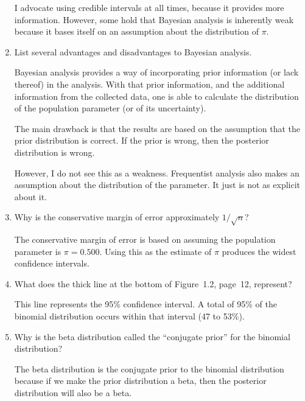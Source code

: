 \begin{enumerate}
\begin{solution}
I advocate using credible intervals at all times, because it provides more information. However, some hold that Bayesian analysis is inherently weak because it bases itself on an assumption about the distribution of $\pi$.
\end{solution}
%


  \item List several advantages and disadvantages to Bayesian analysis.
\begin{solution}
Bayesian analysis provides a way of incorporating prior information (or lack thereof) in the analysis. With that prior information, and the additional information from the collected data, one is able to calculate the distribution of the population parameter (or of its uncertainty).

The main drawback is that the results are based on the assumption that the prior distribution is correct. If the prior is wrong, then the posterior distribution is wrong. 

However, I do not see this as a weakness. Frequentist analysis also makes an assumption about the distribution of the parameter. It just is not as explicit about it.
\end{solution}
%


  \item Why is the conservative margin of error approximately $1/\sqrt{n}$?
\begin{solution}
The conservative margin of error is based on assuming the population parameter is $\pi=0.500$. Using this as the estimate of $\pi$ produces the widest confidence intervals.
\end{solution}
%


  \item What does the thick line at the bottom of Figure~1.2, page~12, represent?
\begin{solution}
This line represents the 95\% confidence interval. A total of 95\% of the binomial distribution occurs within that interval (47 to 53\%).
\end{solution}
%


  \item Why is the beta distribution called the ``conjugate prior'' for the binomial distribution?
\begin{solution}
The beta distribution is the conjugate prior to the binomial distribution because if we make the prior distribution a beta, then the posterior distribution will also be a beta.
\end{solution}
%



\end{enumerate}
